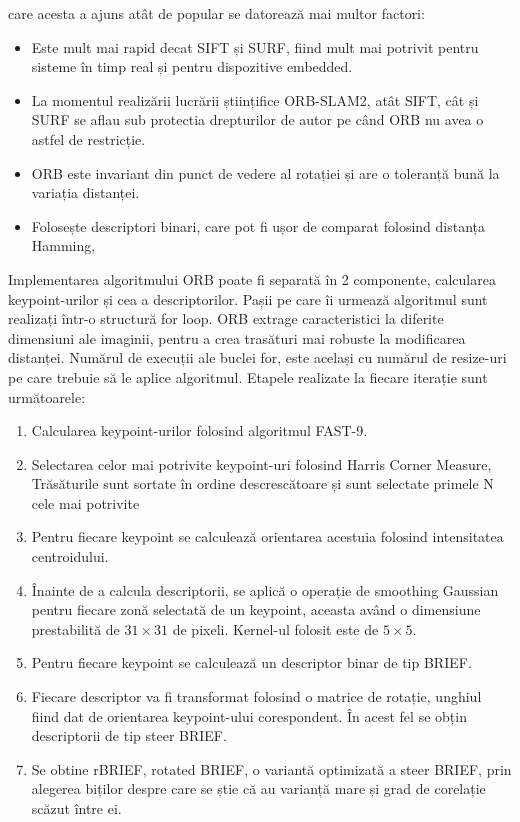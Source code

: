 \documentclass[12pt,a4paper]{report}
\begin{document}
care acesta a ajuns atât de popular se datorează mai multor factori:
\begin{itemize}
    \item Este mult mai rapid decat SIFT și SURF, fiind mult mai potrivit pentru sisteme
în timp real și pentru dispozitive embedded\cite{comparisonsiftsurforb}.
    \item La momentul realizării lucrării științifice ORB-SLAM2, atât SIFT, cât 
și SURF se aflau sub protectia drepturilor de autor pe când ORB nu avea o astfel de restricție.
    \item ORB este invariant din punct de vedere al rotației și are o toleranță bună la variația distanței.   
    \item Folosește descriptori binari, care pot fi ușor de comparat folosind distanța Hamming\cite{hamming1950}, 
\end{itemize}
Implementarea algoritmului ORB poate fi separată în 2 componente, calcularea keypoint-urilor și 
cea a descriptorilor. Pașii pe care îi urmează algoritmul sunt realizați într-o structură for loop.
ORB extrage caracteristici la diferite dimensiuni ale imaginii, pentru a crea trasături mai
robuste la modificarea distanței. Numărul de execuții ale buclei for, este același cu numărul de 
resize-uri pe care trebuie să le aplice algoritmul. Etapele realizate la fiecare iterație sunt următoarele:   
\begin{enumerate}
    \item Calcularea keypoint-urilor folosind algoritmul FAST-9\cite{fast}.
    \item Selectarea celor mai potrivite keypoint-uri folosind Harris Corner Measure\cite{Harris1988ACC}, Trăsăturile
sunt sortate în ordine descrescătoare și sunt selectate primele N cele mai potrivite
    \item Pentru fiecare keypoint se calculează orientarea acestuia folosind intensitatea centroidului. 
    \item Înainte de a calcula descriptorii, se aplică o operație de smoothing Gaussian pentru fiecare 
zonă selectată de un keypoint, aceasta având o dimensiune prestabilită de $ 31 \times 31 $ de pixeli. Kernel-ul folosit este de $ 5 \times 5 $.
    \item Pentru fiecare keypoint se calculează un descriptor binar de tip BRIEF.\@ 
    \item Fiecare descriptor va fi transformat folosind o matrice de rotație, unghiul fiind dat de orientarea keypoint-ului corespondent.
    În acest fel se obțin descriptorii de tip steer BRIEF\cite{brief}.  
    \item  Se obtine rBRIEF, rotated BRIEF, o variantă optimizată a steer BRIEF, prin alegerea biților
despre care se știe că au varianță mare și grad de corelație scăzut între ei.
\end{enumerate}   
\end{document}
